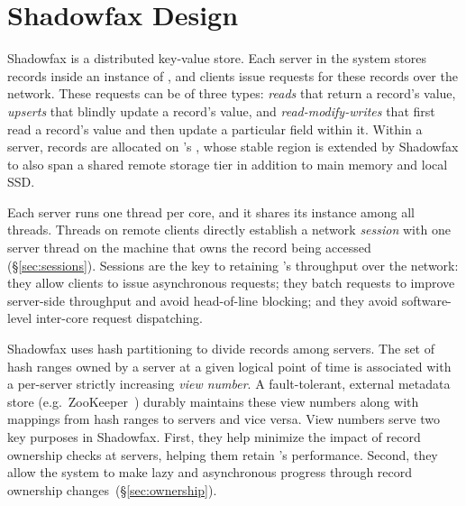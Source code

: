 \section{Shadowfax Design}
\label{sec:design}

Shadowfax is a distributed key-value store.
%
Each server in the system stores records inside an instance of
\faster, and clients issue requests for these records over the network.
%
These requests can be of three types: \emph{reads} that return a
record's value, \emph{upserts} that blindly update a record's value, and
\emph{read-modify-writes} that first read a record's value and then
update a particular field within it.
%
Within a server, records are allocated on \faster's \hlog, whose stable
region is extended by Shadowfax to
also span a shared remote storage tier in addition to main memory and
local SSD.

Each server runs one thread per core, and it shares its \faster instance among all threads.
%
Threads on remote clients directly establish a network \emph{session} with one
server thread on the machine that owns the record being accessed (\S\ref{sec:sessions}).
%
Sessions are the key to retaining \faster{}'s throughput over the
network:
%
they allow clients to issue asynchronous requests;
they batch requests to improve server-side throughput and avoid
  head-of-line blocking;
and they avoid software-level inter-core request dispatching.

Shadowfax uses hash partitioning to divide records among servers.
%
The set of hash ranges owned by a server at a given logical point of
time is associated with a per-server strictly increasing \emph{view
number}.
%
A fault-tolerant, external metadata store (e.g.\ ZooKeeper~\cite{zookeeper})
durably maintains these view numbers along with mappings from hash ranges to
servers and vice versa.
%
View numbers serve two key purposes in Shadowfax.
%
First, they help minimize the impact of record ownership checks at servers,
helping them retain \faster's performance.
%
Second, they allow the system to make lazy and asynchronous progress
through record ownership changes~(\S\ref{sec:ownership}).

